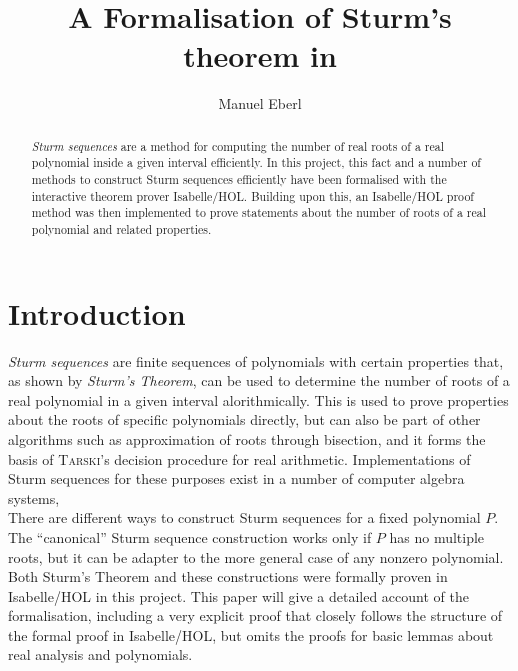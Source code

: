 \documentclass[11pt,a4paper,oneside]{article}
\title{A Formalisation of Sturm's theorem in \isabellehol}
\author{Manuel Eberl}
\newcommand{\isabellehol}{\mbox{Isabelle}\slash HOL\xspace}
\begin{document}
\maketitle

\begin{abstract}
\emph{Sturm sequences} are a method for computing the number of real roots of a real polynomial inside a given interval efficiently. In this project, this fact and a number of me\-thods to construct Sturm sequences efficiently have been formalised with the interactive theorem prover Isabelle\slash HOL. Buil\-ding upon this, an Isabelle\slash HOL proof method was then implemented to prove statements about the number of roots of a real polynomial and related properties.
\end{abstract}\vskip10mm

\tableofcontents
\newpage
\parindent0mm

\section{Introduction}
\emph{Sturm sequences} are finite sequences of polynomials with certain properties that, as shown by \emph{Sturm's Theorem}, can be used to determine the number of roots of a real polynomial in a given interval alorithmically. This is used to prove properties about the roots of specific polynomials directly, but can also be part of other algorithms such as approximation of roots through bisection, and it forms the basis of \textsc{Tarski}'s decision procedure for real arithmetic. Implementations of Sturm sequences for these purposes exist in a number of computer algebra systems, %
\\

There are different ways to construct Sturm sequences for a fixed polynomial $P$. The \enquote{canonical} Sturm sequence construction works only if $P$ has no multiple roots, but it can be adapter to the more general case of any nonzero polynomial.\\

Both Sturm's Theorem and these constructions were formally proven in \isabellehol in this project. This paper will give a detailed account of the formalisation, including a very explicit proof that closely follows the structure of the formal proof in \isabellehol, but omits the proofs for basic lemmas about real analysis and polynomials.\\
\end{document}
